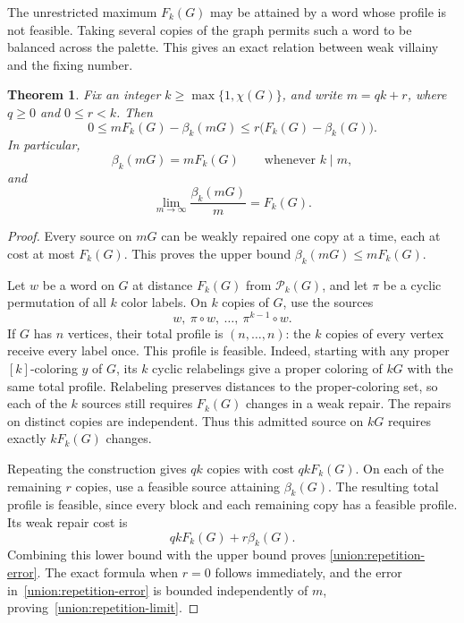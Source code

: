 \documentclass[10pt,a4paper]{amsart}
\numberwithin{equation}{section}
\newtheorem{theorem}{Theorem}[section]
\theoremstyle{definition}
\theoremstyle{remark}
\begin{document}
The unrestricted maximum $F_k(G)$ may be attained by a word whose
profile is not feasible.  Taking several copies of the graph permits
such a word to be balanced across the palette.  This gives an exact
relation between weak villainy and the fixing number.

\begin{theorem}\label{union:repetition-theorem}
Fix an integer $k\ge\max\{1,\chi(G)\}$, and write $m=qk+r$, where
$q\ge0$ and $0\le r<k$.  Then
\begin{equation}\label{union:repetition-error}
 0\le mF_k(G)-\beta_k(mG)
 \le r\bigl(F_k(G)-\beta_k(G)\bigr).
\end{equation}
In particular,
\begin{equation}\label{union:repetition-exact}
 \beta_k(mG)=mF_k(G)\qquad\text{whenever }k\mid m,
\end{equation}
and
\begin{equation}\label{union:repetition-limit}
 \lim_{m\to\infty}\frac{\beta_k(mG)}m=F_k(G).
\end{equation}
\end{theorem}

\begin{proof}
Every source on $mG$ can be weakly repaired one copy at a time, each
at cost at most $F_k(G)$.  This proves the upper bound
$\beta_k(mG)\le mF_k(G)$.

Let $w$ be a word on $G$ at distance $F_k(G)$ from
$\mathcal P_k(G)$, and let $\pi$ be a cyclic permutation of all $k$
color labels.  On $k$ copies of $G$, use the sources
\[
 w,\ \pi\circ w,\ \ldots,\ \pi^{k-1}\circ w.
\]
If $G$ has $n$ vertices, their total profile is
$(n,\ldots,n)$: the $k$ copies of every vertex receive every label
once.  This profile is feasible.  Indeed, starting with any proper
$[k]$-coloring $y$ of $G$, its $k$ cyclic relabelings give a proper coloring
of $kG$ with the same total profile.
Relabeling preserves distances to the proper-coloring set, so each
of the $k$ sources still requires $F_k(G)$ changes in a weak repair.
The repairs on distinct copies are independent.  Thus this admitted
source on $kG$ requires exactly $kF_k(G)$ changes.

Repeating the construction gives $qk$ copies with cost $qkF_k(G)$.
On each of the remaining $r$ copies, use a feasible source attaining
$\beta_k(G)$.  The resulting total profile is feasible, since
every block and each remaining copy has a feasible profile.
Its weak repair cost is
\[
 qkF_k(G)+r\beta_k(G).
\]
Combining this lower bound with the upper bound proves
\eqref{union:repetition-error}.  The exact formula when $r=0$ follows
immediately, and the error in~\eqref{union:repetition-error} is bounded
independently of $m$, proving~\eqref{union:repetition-limit}.
\end{proof}
\end{document}
